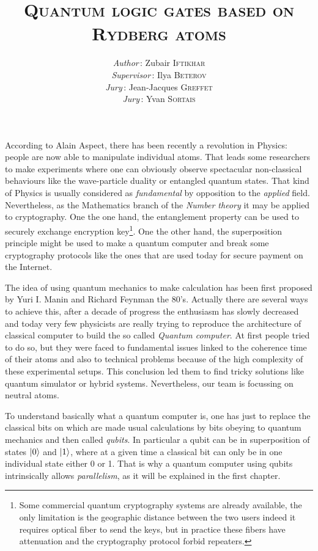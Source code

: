 \documentclass[%
]{scrreprt}
\title{\rmfamily \scshape Quantum logic gates based on \\ Rydberg atoms \vspace{5cm} }
\author{
  \textit{Author}\,: \hspace{3cm} \hfill Zubair \textsc{Iftikhar} \\
  \textit{Supervisor}\,: \hfill Ilya \textsc{Beterov} \\
  \textit{Jury}\,: \hfill Jean-Jacques \textsc{Greffet} \\
  \textit{Jury}\,: \hfill Yvan \textsc{Sortais}
}
\date{}
\newcommand{\g}{\ensuremath{\ket{0}}\xspace}
\newcommand{\e}{\ensuremath{\ket{1}}\xspace}
\begin{document}
\maketitle
\tableofcontents


\bigskip

\par According to Alain Aspect, there has been recently a revolution in Physics: people are now able to manipulate individual atoms. That leads some researchers to make experiments where one can obviously observe spectacular non-classical behaviours like the wave-particle duality or entangled quantum states. That kind of Physics is usually considered as \emph{fundamental} by opposition to the \emph{applied} field. Nevertheless, as the Mathematics branch of the \emph{Number theory} it may be applied to cryptography. One the one hand, the entanglement property can be used to securely exchange encryption key\footnote{Some commercial quantum cryptography systems are already available, the only limitation is the geographic distance between the two users indeed it requires optical fiber to send the keys, but in practice these fibers have attenuation and the cryptography protocol forbid repeaters.}. One the other hand, the superposition principle might be used to make a quantum computer and break some cryptography protocols like the ones that are used today for secure payment on the Internet. 

\par The idea of using quantum mechanics to make calculation has been first proposed by Yuri I. Manin and Richard Feynman the 80's. Actually there are several ways to achieve this, after a decade of progress the enthusiasm has slowly decreased and today very few physicists are really trying to reproduce the architecture of classical computer to build the so called \emph{Quantum computer}. At first people tried to do so, but they were faced to fundamental issues linked to the coherence time of their atoms and also to technical problems because of the high complexity of these experimental setups. This conclusion led them to find tricky solutions like quantum simulator or hybrid systems. Nevertheless, our team is focussing on neutral atoms.

\par To understand basically what a quantum computer is, one has just to replace the classical bits on which are made usual calculations by bits obeying to quantum mechanics and then called \emph{qubits}. In particular a qubit can be in superposition of states \g and \e, where at a given time a classical bit can only be in one individual state either 0 or 1. That is why a quantum computer using qubits intrinsically allows \emph{parallelism}, as it will be explained in the first chapter.
\end{document}
